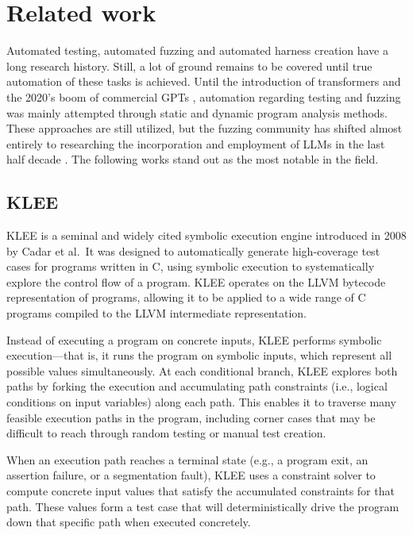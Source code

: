 \documentclass[
  a4paper,
]{scrreprt}
\theoremstyle{definition}
\theoremstyle{remark}
\begin{document}

\chapter{Related work}\label{sec-related}

Automated testing, automated fuzzing and automated harness creation have
a long research history. Still, a lot of ground remains to be covered
until true automation of these tasks is achieved. Until the introduction
of transformers \autocite{vaswani2023} and the 2020's boom of commercial
GPTs \autocite{chatgpt}, automation regarding testing and fuzzing was
mainly attempted through static and dynamic program analysis methods.
These approaches are still utilized, but the fuzzing community has
shifted almost entirely to researching the incorporation and employment
of LLMs in the last half decade
\autocite{iris,sun2024,prophetfuzz,oss-fuzz-gen,green2022,utopia,fuzzgpt,titanfuzz,fuzzgen,fudge}.
The following works stand out as the most notable in the field.

\section{KLEE}\label{klee}

KLEE \autocite{klee} is a seminal and widely cited symbolic execution
engine introduced in 2008 by Cadar et al.~It was designed to
automatically generate high-coverage test cases for programs written in
C, using symbolic execution to systematically explore the control flow
of a program. KLEE operates on the LLVM \autocite{llvm} bytecode
representation of programs, allowing it to be applied to a wide range of
C programs compiled to the LLVM intermediate representation.

Instead of executing a program on concrete inputs, KLEE performs
symbolic execution---that is, it runs the program on symbolic inputs,
which represent all possible values simultaneously. At each conditional
branch, KLEE explores both paths by forking the execution and
accumulating path constraints (i.e., logical conditions on input
variables) along each path. This enables it to traverse many feasible
execution paths in the program, including corner cases that may be
difficult to reach through random testing or manual test creation.

When an execution path reaches a terminal state (e.g., a program exit,
an assertion failure, or a segmentation fault), KLEE uses a constraint
solver to compute concrete input values that satisfy the accumulated
constraints for that path. These values form a test case that will
deterministically drive the program down that specific path when
executed concretely.
\end{document}
